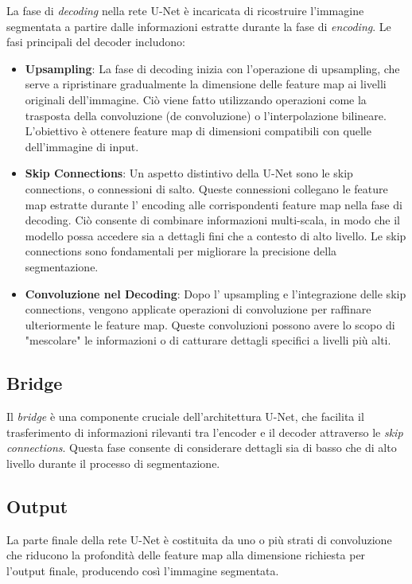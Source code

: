 La fase di \textit{decoding} nella rete U-Net è incaricata di ricostruire l'immagine segmentata a
partire dalle informazioni estratte durante la fase di \textit{encoding}. Le fasi principali del
decoder includono:
\begin{itemize}
	\item \textbf{Upsampling}: La fase di decoding inizia con l'operazione di upsampling, che serve a ripristinare gradualmente la dimensione delle feature map ai livelli originali dell'immagine. Ciò viene fatto utilizzando operazioni come la trasposta della convoluzione (de convoluzione) o l'interpolazione bilineare. L'obiettivo è ottenere feature map di dimensioni compatibili con quelle dell'immagine di input.
	\item \textbf{Skip Connections}: Un aspetto distintivo della U-Net sono le skip connections, o connessioni di salto. Queste connessioni collegano le feature map estratte durante l' encoding alle corrispondenti feature map nella fase di decoding. Ciò consente di combinare informazioni multi-scala, in modo che il modello possa accedere sia a dettagli fini che a contesto di alto livello. Le skip connections sono fondamentali per migliorare la precisione della segmentazione.
	\item \textbf{Convoluzione nel Decoding}: Dopo l' upsampling e l'integrazione delle skip connections, vengono applicate operazioni di convoluzione per raffinare ulteriormente le feature map. Queste convoluzioni possono avere lo scopo di "mescolare" le informazioni o di catturare dettagli specifici a livelli più alti.
\end{itemize}

\subsection{Bridge}
\label{sec:Bridge}

Il \textit{bridge} è una componente cruciale dell'architettura U-Net, che facilita il trasferimento
di informazioni rilevanti tra l'encoder e il decoder attraverso le \textit{skip connections}. Questa fase
consente di considerare dettagli sia di basso che di alto livello durante il processo di
segmentazione.

\subsection{Output}
\label{sec:Output}
La parte finale della rete U-Net è costituita da uno o più strati di convoluzione che riducono la
profondità delle feature map alla dimensione richiesta per l'output finale, producendo così
l'immagine segmentata.


